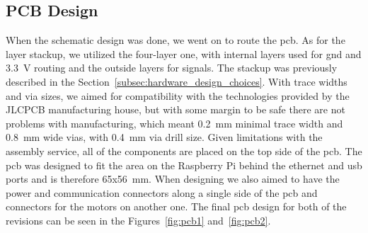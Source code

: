 \subsection{PCB Design}
\label{subsec:pcb_design}
When the schematic design was done, we went on to route the \acs{pcb}.
As for the layer stackup, we utilized the four-layer one, with internal layers used for \acs{gnd} and 3.3~V routing and the outside layers for signals.
The stackup was previously described in the Section~\ref{subsec:hardware_design_choices}.
With trace widths and via sizes, we aimed for compatibility with the technologies provided by the JLCPCB manufacturing house, but with some margin to be safe there are not problems with manufacturing, which meant 0.2~mm minimal trace width and 0.8~mm wide vias, with 0.4~mm via drill size.
Given limitations with the assembly service, all of the components are placed on the top side of the \acs{pcb}.
The \acs{pcb} was designed to fit the area on the Raspberry Pi behind the ethernet and \acs{usb} ports and is therefore 65x56~mm.
When designing we also aimed to have the power and communication connectors along a single side of the \acs{pcb} and connectors for the motors on another one.
The final \acs{pcb} design for both of the revisions can be seen in the Figures~\ref{fig:pcb1} and~\ref{fig:pcb2}.

